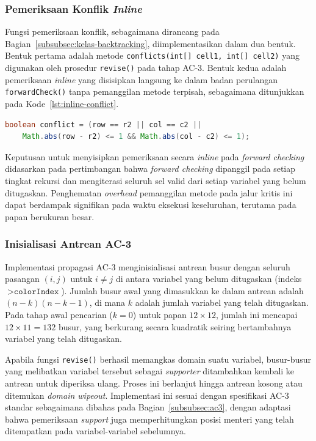 \subsubsection{Pemeriksaan Konflik \textit{Inline}}

Fungsi pemeriksaan konflik, sebagaimana dirancang pada Bagian~\ref{subsubsec:kelas-backtracking}, diimplementasikan dalam dua bentuk. Bentuk pertama adalah metode \texttt{conflicts(int[] cell1, int[] cell2)} yang digunakan oleh prosedur \texttt{revise()} pada tahap AC-3. Bentuk kedua adalah pemeriksaan \textit{inline} yang disisipkan langsung ke dalam badan perulangan \texttt{forwardCheck()} tanpa pemanggilan metode terpisah, sebagaimana ditunjukkan pada Kode~\ref{lst:inline-conflict}.

\begin{lstlisting}[language=Java, caption=Pemeriksaan konflik \textit{inline} pada \textit{forward checking}, label={lst:inline-conflict}]
	boolean conflict = (row == r2 || col == c2 || 
	Math.abs(row - r2) <= 1 && Math.abs(col - c2) <= 1);
\end{lstlisting}

Keputusan untuk menyisipkan pemeriksaan secara \textit{inline} pada \textit{forward checking} didasarkan pada pertimbangan bahwa \textit{forward checking} dipanggil pada setiap tingkat rekursi dan mengiterasi seluruh sel valid dari setiap variabel yang belum ditugaskan. Penghematan \textit{overhead} pemanggilan metode pada jalur kritis ini dapat berdampak signifikan pada waktu eksekusi keseluruhan, terutama pada papan berukuran besar.

\subsubsection{Inisialisasi Antrean AC-3}

Implementasi propagasi AC-3 menginisialisasi antrean busur dengan seluruh pasangan $(i, j)$ untuk $i \neq j$ di antara variabel yang belum ditugaskan (indeks $> \texttt{colorIndex}$). Jumlah busur awal yang dimasukkan ke dalam antrean adalah $(n - k)(n - k - 1)$, di mana $k$ adalah jumlah variabel yang telah ditugaskan. Pada tahap awal pencarian ($k = 0$) untuk papan $12 \times 12$, jumlah ini mencapai $12 \times 11 = 132$ busur, yang berkurang secara kuadratik seiring bertambahnya variabel yang telah ditugaskan.

Apabila fungsi \texttt{revise()} berhasil memangkas domain suatu variabel, busur-busur yang melibatkan variabel tersebut sebagai \textit{supporter} ditambahkan kembali ke antrean untuk diperiksa ulang. Proses ini berlanjut hingga antrean kosong atau ditemukan \textit{domain wipeout}. Implementasi ini sesuai dengan spesifikasi AC-3 standar sebagaimana dibahas pada Bagian~\ref{subsubsec:ac3}, dengan adaptasi bahwa pemeriksaan \textit{support} juga memperhitungkan posisi menteri yang telah ditempatkan pada variabel-variabel sebelumnya.

